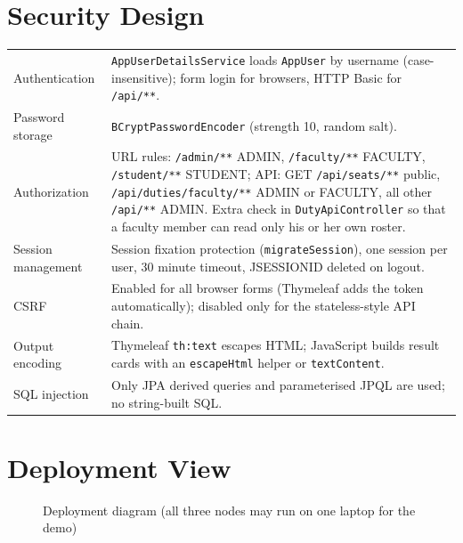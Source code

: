 \documentclass[11pt,a4paper]{article}
\begin{document}
\section{Security Design}
\begin{tabularx}{\linewidth}{|L{3.4cm}|X|}
\hline\headrow{} & \\\hline
Authentication & \texttt{AppUserDetailsService} loads \texttt{AppUser} by username (case-insensitive); form login for browsers, HTTP Basic for \texttt{/api/**}.\\\hline
Password storage & \texttt{BCryptPasswordEncoder} (strength 10, random salt).\\\hline
Authorization & URL rules: \texttt{/admin/**} ADMIN, \texttt{/faculty/**} FACULTY, \texttt{/student/**} STUDENT; API: GET \texttt{/api/seats/**} public, \texttt{/api/duties/faculty/**} ADMIN or FACULTY, all other \texttt{/api/**} ADMIN. Extra check in \texttt{DutyApiController} so that a faculty member can read only his or her own roster.\\\hline
Session management & Session fixation protection (\texttt{migrateSession}), one session per user, 30 minute timeout, JSESSIONID deleted on logout.\\\hline
CSRF & Enabled for all browser forms (Thymeleaf adds the token automatically); disabled only for the stateless-style API chain.\\\hline
Output encoding & Thymeleaf \texttt{th:text} escapes HTML; JavaScript builds result cards with an \texttt{escapeHtml} helper or \texttt{textContent}.\\\hline
SQL injection & Only JPA derived queries and parameterised JPQL are used; no string-built SQL.\\\hline
\end{tabularx}

\section{Deployment View}
\begin{figure}[H]\centering
{}
\caption{Deployment diagram (all three nodes may run on one laptop for the demo)}
\end{figure}
\end{document}
